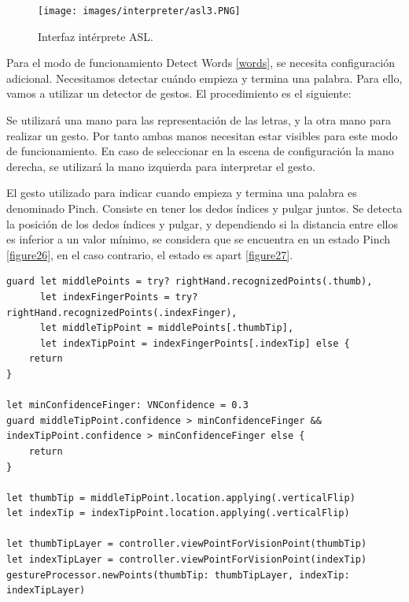 \documentclass[../main.tex]{subfiles}
\begin{document}
\begin{figure}[h]
\centering 
\texttt{[image: images/interpreter/asl3.PNG]}
\caption{Interfaz intérprete ASL.}
\label{figure25}
\end{figure}

Para el modo de funcionamiento Detect Words \ref{words}, se necesita configuración adicional. Necesitamos detectar cuándo  empieza y termina una palabra. Para ello, vamos a utilizar un detector de gestos. El procedimiento es el siguiente:

Se utilizará una mano para las representación de las letras, y la otra mano para realizar un gesto. Por tanto ambas manos necesitan estar visibles para este modo de funcionamiento. En caso de seleccionar en la escena de configuración la mano derecha, se utilizará la mano izquierda para interpretar el gesto.

El gesto utilizado para indicar cuando empieza y termina una palabra es denominado Pinch. Consiste en tener los dedos índices y pulgar juntos. Se detecta la posición de los dedos índices y pulgar, y dependiendo si la distancia entre ellos es inferior a un valor mínimo, se considera que se encuentra en un estado Pinch \ref{figure26}, en el caso contrario, el estado es apart \ref{figure27}.

\begin{lstlisting}[style=swift]
guard let middlePoints = try? rightHand.recognizedPoints(.thumb),
      let indexFingerPoints = try? rightHand.recognizedPoints(.indexFinger),
      let middleTipPoint = middlePoints[.thumbTip],
      let indexTipPoint = indexFingerPoints[.indexTip] else {
    return
}
    
let minConfidenceFinger: VNConfidence = 0.3
guard middleTipPoint.confidence > minConfidenceFinger && indexTipPoint.confidence > minConfidenceFinger else {
    return
}

let thumbTip = middleTipPoint.location.applying(.verticalFlip)
let indexTip = indexTipPoint.location.applying(.verticalFlip)

let thumbTipLayer = controller.viewPointForVisionPoint(thumbTip)
let indexTipLayer = controller.viewPointForVisionPoint(indexTip)
gestureProcessor.newPoints(thumbTip: thumbTipLayer, indexTip: indexTipLayer)
\end{lstlisting}
\end{document}
